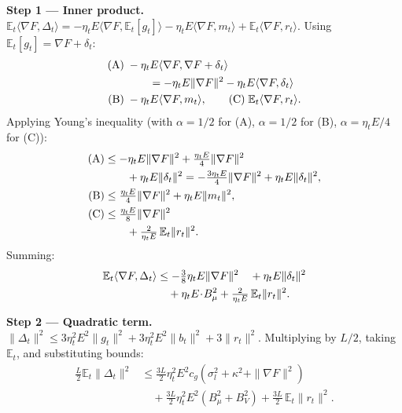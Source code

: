 \noindent\textbf{Step 1 --- Inner product.}
\(\mathbb E_t\langle\nabla F, \Delta_t\rangle
 = -\eta_t E\langle\nabla F, \mathbb E_t[g_t]\rangle
   - \eta_t E\langle\nabla F, m_t\rangle
   + \mathbb E_t\langle\nabla F, r_t\rangle\).
Using \(\mathbb E_t[g_t] = \nabla F + \delta_t\):
\begin{align*}
  \text{(A)}\;& -\eta_t E\langle\nabla F, \nabla F + \delta_t\rangle \notag\\
              &\qquad = -\eta_t E\|\nabla F\|^2 - \eta_t E\langle\nabla F, \delta_t\rangle\\
  \text{(B)}\;& -\eta_t E\langle\nabla F, m_t\rangle,\qquad
  \text{(C)}\; \mathbb E_t\langle\nabla F, r_t\rangle.
\end{align*}
Applying Young's inequality (with \(\alpha = 1/2\) for (A), \(\alpha = 1/2\) for (B), \(\alpha = \eta_t E/4\) for (C)):
\begin{align*}
  \text{(A)} &\le -\eta_t E\|\nabla F\|^2 + \tfrac{\eta_t E}{4}\|\nabla F\|^2 \notag\\
             &\qquad + \eta_t E\|\delta_t\|^2
              = -\tfrac{3\eta_t E}{4}\|\nabla F\|^2 + \eta_t E\|\delta_t\|^2,\\
  \text{(B)} &\le \tfrac{\eta_t E}{4}\|\nabla F\|^2 + \eta_t E\|m_t\|^2,\\
  \text{(C)} &\le \tfrac{\eta_t E}{8}\|\nabla F\|^2 \notag\\
            &\qquad + \tfrac{2}{\eta_t E}\,\mathbb E_t\|r_t\|^2.
\end{align*}
Summing:
\begin{align*}
  \mathbb E_t\langle\nabla F, \Delta_t\rangle
  &\le -\tfrac{3}{8}\eta_t E\|\nabla F\|^2 \quad + \eta_t E\|\delta_t\|^2 \notag\\
  &\quad + \eta_t E\!\cdot\! B_\mu^2
     + \tfrac{2}{\eta_t E}\,\mathbb E_t\|r_t\|^2.
\end{align*}

\noindent\textbf{Step 2 --- Quadratic term.}
\(\|\Delta_t\|^2 \le 3\eta_t^2 E^2\|g_t\|^2 + 3\eta_t^2 E^2\|b_t\|^2 + 3\|r_t\|^2\).
Multiplying by \(L/2\), taking \(\mathbb E_t\), and substituting bounds:
\begin{align*}
  \frac{L}{2}\mathbb E_t\|\Delta_t\|^2
  &\le \frac{3L}{2}\eta_t^2 E^2 c_g(\sigma_l^2 + \kappa^2 + \|\nabla F\|^2) \\
  &\quad + \frac{3L}{2}\eta_t^2 E^2(B_\mu^2 + B_V^2)
     + \frac{3L}{2}\,\mathbb E_t\|r_t\|^2.
\end{align*}

